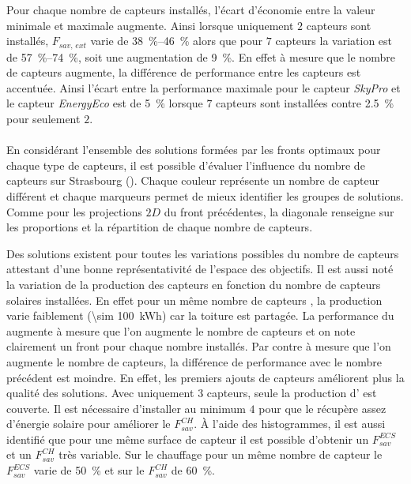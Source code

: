 Pour chaque nombre de capteurs installés, l’écart d’économie entre la valeur minimale et
maximale augmente. Ainsi lorsque uniquement $2$ capteurs sont installés, $F_{sav,\, ext}$
varie de \SIrange{38}{46}{\percent} alors que pour $7$ capteurs la variation est de
\SIrange{57}{74}{\percent}, soit une augmentation de \SI{9}{\percent}. En effet à mesure
que le nombre de capteurs augmente, la différence de performance entre les capteurs est
accentuée. Ainsi l’écart entre la performance maximale pour le capteur \textit{SkyPro} et
le capteur \textit{EnergyEco} est de \SI{5}{\percent} lorsque $7$ capteurs sont installées
contre \SI{2.5}{\percent} pour seulement $2$.


\paragraph{} %
En considérant l’ensemble des solutions formées par les fronts optimaux pour chaque
type de capteurs, il est possible d’évaluer l’influence du nombre de capteurs
sur Strasbourg (). Chaque couleur représente un
nombre de capteur différent et chaque marqueurs permet de mieux identifier les
groupes de solutions. Comme pour les projections $2D$ du front précédentes, la diagonale
renseigne sur les proportions et la répartition de chaque nombre de capteurs.

Des solutions existent pour toutes les variations possibles du nombre de capteurs
attestant d’une bonne représentativité de l’espace des objectifs. Il est aussi noté la
variation de la production des capteurs  en fonction du nombre de capteurs
solaires installées. En effet pour un même nombre de capteurs , la production
varie faiblement (\SI{\sim 100}{kWh}) car la toiture est partagée. La performance du
 augmente à mesure que l’on augmente le nombre de capteurs et on note clairement
un front pour chaque nombre installés. Par contre à mesure que l’on augmente le nombre de
capteurs, la différence de performance avec le nombre précédent est moindre. En effet, les
premiers ajouts de capteurs améliorent plus la qualité des solutions. Avec uniquement $3$
capteurs, seule la production d’ est couverte. Il est nécessaire d’installer au
minimum $4$ pour que le  récupère assez d’énergie solaire pour améliorer le
$F_{sav}^{CH}$. À l’aide des histogrammes, il est aussi identifié que pour une même
surface de capteur il est possible d’obtenir un $F_{sav}^{ECS}$ et un $F_{sav}^{CH}$ très
variable. Sur le chauffage pour un même nombre de capteur le $F_{sav}^{ECS}$ varie de
\SI{50}{\percent} et sur le $F_{sav}^{CH}$ de \SI{60}{\percent}.

